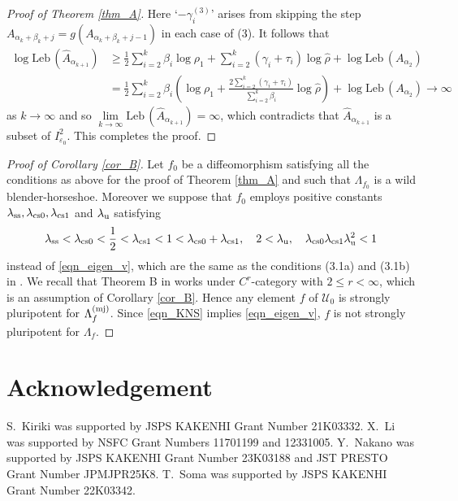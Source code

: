 \documentclass{amsart}
\theoremstyle{plain}
\theoremstyle{definition}
\theoremstyle{remark}
\numberwithin{equation}{section}
\begin{document}
\begin{proof}[Proof of Theorem \ref{thm_A}]
Here `$-\gamma_i^{(3)}$' arises from skipping the step 
$A_{\alpha_k+\beta_k+j} = g(A_{\alpha_k+\beta_k+j-1})$ in each case of (3).
It follows that 
\begin{align*}
\log \mathrm{Leb}\,(\widehat A_{\alpha_{k+1}})&\geq 
\frac12\sum_{i=2}^k\beta_i\log \rho_1+
\sum_{i=2}^k(\gamma_i+\tau_i)\log \widehat\rho+\log\mathrm{Leb}\,(A_{\alpha_2})\\
&=\frac12\sum_{i=2}^k\beta_i\left(\log \rho_1+\frac{2\sum_{i=2}^k(\gamma_i+\tau_i)}{\sum_{i=2}^k\beta_i}\log \widehat\rho\right)+\log\mathrm{Leb}\,(A_{\alpha_2})\to \infty
\end{align*}
as $k\to \infty$ and so $\lim\limits_{k\to \infty}\mathrm{Leb}\,(\widehat A_{\alpha_{k+1}})=\infty$, which contradicts that $\widehat A_{\alpha_{k+1}}$ is a subset of $I_{\varepsilon_0}^2$.
This completes the proof.
\end{proof}


\begin{proof}[Proof of Corollary \ref{cor_B}]
Let $f_0$ be a diffeomorphism satisfying all the conditions as above 
for the proof of Theorem \ref{thm_A} and such that $\Lambda_{f_0}$ is a wild blender-horseshoe.
Moreover we suppose that $f_0$ employs positive constants $\lambda_{\rm ss}, \lambda_{\rm cs0}, \lambda_{\rm cs1}$ and $\lambda_{\rm u}$ 
satisfying 
\begin{equation}\label{eqn_KNS}
\lambda_{\rm ss}<\lambda_{\rm cs0}<\frac12<\lambda_{\rm cs1}<1<
\lambda_{\rm cs0}+\lambda_{\rm cs1},\quad 2<\lambda_{\rm u},\quad \lambda_{\rm cs0}\lambda_{\rm cs1}\lambda_{\rm u}^2<1
\end{equation}
instead of \eqref{eqn_eigen_v}, which are 
the same as the conditions (3.1a) and (3.1b) in \cite{KNS}.
We recall that Theorem B in \cite{KNS} works under $C^r$-category with $2\leq r<\infty$, 
which is an assumption of Corollary \ref{cor_B}.
Hence any element $f$ of $\mathcal{U}_0$ is strongly pluripotent 
for $\Lambda_f^{({\rm mj})}$.
Since \eqref{eqn_KNS} implies \eqref{eqn_eigen_v},  
$f$ is not strongly pluripotent for $\Lambda_f$.
\end{proof}



\section*{Acknowledgement}
S.~Kiriki was supported by JSPS KAKENHI Grant Number 21K03332.
X.~Li was supported by NSFC Grant Numbers 11701199 and 12331005.
Y.~Nakano was supported by JSPS KAKENHI Grant  Number 23K03188 and JST PRESTO Grant Number JPMJPR25K8.
T.~Soma was supported by JSPS KAKENHI Grant Number 22K03342.
\end{document}
